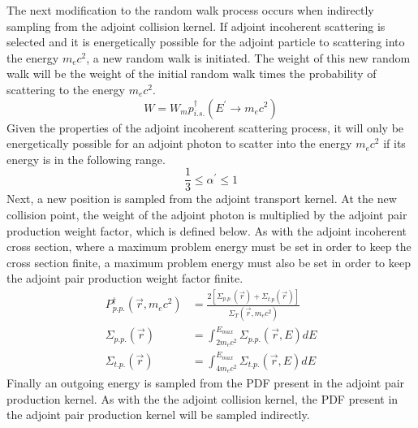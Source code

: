 The next modification to the random walk process occurs when indirectly 
sampling from the adjoint collision kernel. If adjoint incoherent scattering is 
selected and it is energetically possible for the adjoint particle to 
scattering into the energy $m_ec^2$, a new random walk is initiated. The weight 
of this new random walk will be the weight of the initial random walk times the 
probability of scattering to the energy $m_ec^2$.
\begin{equation}
  W = W_m p_{i.s.}^{\dagger}(E^{'} \to m_ec^2)
\end{equation}
Given the properties of the adjoint incoherent scattering process, it will
only be energetically possible for an adjoint photon to scatter into the
energy $m_ec^2$ if its energy is in the following range.
\begin{equation}
  \frac{1}{3} \leq \alpha^{'} \leq 1
\end{equation}
Next, a new position is sampled from the adjoint transport kernel. At the
new collision point, the weight of the adjoint photon is multiplied by the 
adjoint pair production weight factor, which is defined below. As with the
adjoint incoherent cross section, where a maximum problem energy must be set in
order to keep the cross section finite, a maximum problem energy must also be 
set in order to keep the adjoint pair production weight factor finite. 
\begin{align}
  P_{p.p.}^{\dagger}(\vec{r},m_ec^2) & = 
  \frac{2\left[\Sigma_{p.p.}(\vec{r})+\Sigma_{t.p}(\vec{r})\right]}
       {\Sigma_T(\vec{r},m_ec^2)} \\
  \Sigma_{p.p.}(\vec{r}) & = \int_{2m_ec^2}^{E_{max}}\Sigma_{p.p.}(\vec{r},E)dE \\
  \Sigma_{t.p.}(\vec{r}) & = \int_{4m_ec^2}^{E_{max}}\Sigma_{t.p.}(\vec{r},E)dE
\end{align}
Finally an outgoing energy is sampled from the PDF present in the adjoint
pair production kernel. As with the the adjoint collision kernel, the 
PDF present in the adjoint pair production kernel will be sampled indirectly.
